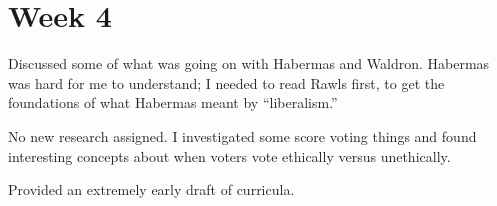 
\section{Week 4}

Discussed some of what was going on with Habermas and Waldron.  Habermas was hard for me to understand; I needed to read Rawls first, to get the foundations of what Habermas meant by ``liberalism.''

No new research assigned.  I investigated some score voting things and found interesting concepts about when voters vote ethically versus unethically.

Provided an extremely early draft of curricula.

